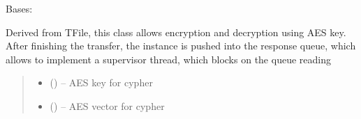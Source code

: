 \documentclass[letterpaper,10pt,english]{sphinxmanual}
\begin{document}
\begin{savenotes}\begin{fulllineitems}
\label{\detokenize{eezz:eezz.filesrv.TEezzFile}}
\pysigstartsignatures
{}
\pysigstopsignatures
\sphinxAtStartPar
Bases: {\hyperref[\detokenize{eezz:eezz.filesrv.TFile}]{}}

\sphinxAtStartPar
Derived from TFile, this class allows encryption and decryption using AES key.
After finishing the transfer, the instance is pushed into the response queue, which allows to implement a
supervisor thread, which blocks on the queue reading
\begin{quote}\begin{description}
\begin{itemize}
\item {} 
\sphinxAtStartPar
{} (\sphinxstyleliteralemphasis{\sphinxupquote{(}}\sphinxstyleliteralemphasis{\sphinxupquote{)}}) – AES key for cypher

\item {} 
\sphinxAtStartPar
{} (\sphinxstyleliteralemphasis{\sphinxupquote{(}}\sphinxstyleliteralemphasis{\sphinxupquote{)}}) – AES vector for cypher


\end{itemize}
\end{description}
\end{quote}
\end{fulllineitems}
\end{savenotes}
\end{document}
